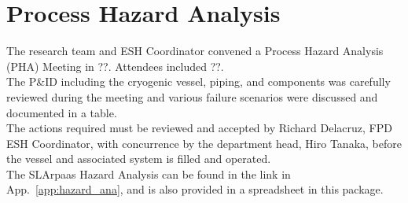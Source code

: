\section{Process Hazard Analysis}
\label{sec:hazard_ana}

The research team and ESH Coordinator convened a Process Hazard Analysis (PHA) 
Meeting in ??. 
Attendees included ??.\\

The P\&ID including the cryogenic vessel, piping, and components was carefully reviewed 
during the meeting and various failure scenarios were discussed and documented in a table.\\

The actions required must be reviewed and accepted by Richard Delacruz, FPD ESH Coordinator, 
with concurrence by the department head, Hiro Tanaka, before the vessel and associated 
system is filled and operated.\\

The SLArpaas Hazard Analysis can be found in the link in App.~\ref{app:hazard_ana},
and is also provided in a spreadsheet in this package.
